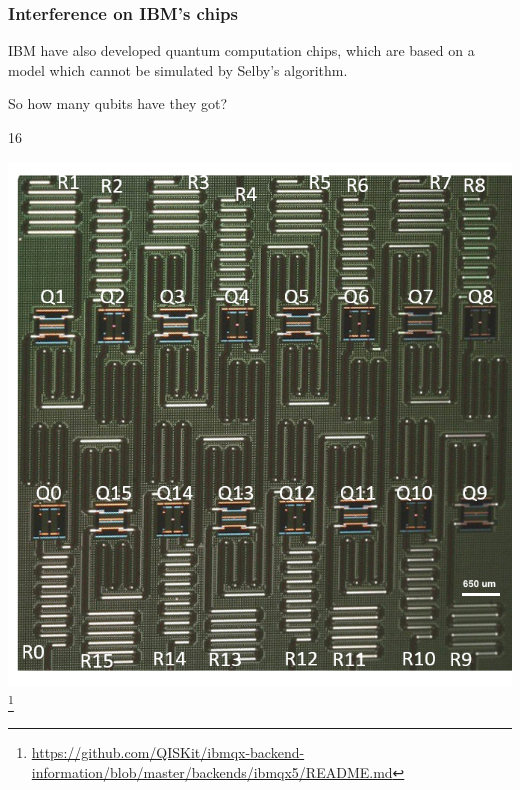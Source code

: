 \documentclass[]{beamer}
\begin{document}

\begin{frame}
\frametitle{Interference on IBM's chips}

IBM have also developed quantum computation chips, which are based on a model which cannot be simulated by Selby's algorithm.

So how many qubits have they got?
\end{frame}

\begin{frame}
\begin{center}
\begin{huge}
16
\end{huge}

\includegraphics[scale=0.3]{ibmqx3-labeled}\footnote{\url{https://github.com/QISKit/ibmqx-backend-information/blob/master/backends/ibmqx5/README.md}}
\end{center}
\end{frame}

\end{document}
